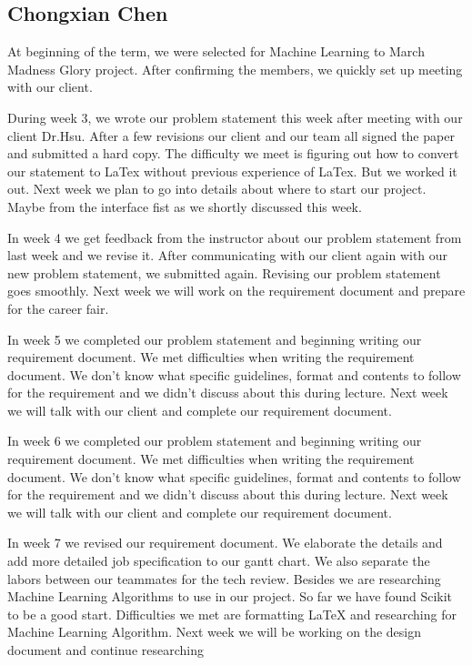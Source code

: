 \documentclass[letterpaper, 10pt,titlepage]{article}
\begin{document}
\subsection{Chongxian Chen}
\par At beginning of the term, we were selected for Machine Learning to March Madness Glory project. After confirming the members, we quickly set up meeting with our client.
\par During week 3, we wrote our problem statement this week after meeting with our client Dr.Hsu. After a few revisions our client and our team all signed the paper and submitted a hard copy. The difficulty we meet is figuring out how to convert our statement to LaTex without previous experience of LaTex. But we worked it out. Next week we plan to go into details about where to start our project. Maybe from the interface fist as we shortly discussed this week.
\par In week 4 we get feedback from the instructor about our problem statement from last week and we revise it. After communicating with our client again with our new problem statement, we submitted again. Revising our problem statement goes smoothly. Next week we will work on the requirement document and prepare for the career fair.

\par In week 5 we completed our problem statement and beginning writing our requirement document. We met difficulties when writing the requirement document. We don't know what specific guidelines, format and contents to follow for the requirement and we didn't discuss about this during lecture. Next week we will talk with our client and complete our requirement document.

\par In week 6 we completed our problem statement and beginning writing our requirement document. We met difficulties when writing the requirement document. We don't know what specific guidelines, format and contents to follow for the requirement and we didn't discuss about this during lecture. Next week we will talk with our client and complete our requirement document.

\par In week 7 we revised our requirement document. We elaborate the details and add more detailed job specification to our gantt chart. We also separate the labors between our teammates for the tech review. Besides we are researching Machine Learning Algorithms to use in our project. So far we have found Scikit to be a good start. Difficulties we met are formatting LaTeX and researching for Machine Learning Algorithm. Next week we will be working on the design document and continue researching
\end{document}
